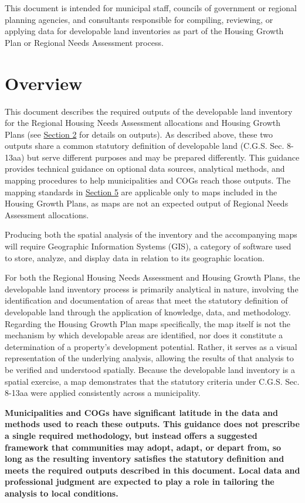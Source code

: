 \documentclass[
  letterpaper,
  DIV=11,
  numbers=noendperiod]{scrreprt}
\begin{document}
This document is intended for municipal staff, councils of government or
regional planning agencies, and consultants responsible for compiling,
reviewing, or applying data for developable land inventories as part of
the Housing Growth Plan or Regional Needs Assessment process.

\section{Overview}\label{overview}

This document describes the required outputs of the developable land
inventory for the Regional Housing Needs Assessment allocations and
Housing Growth Plans (see \href{outputs.qmd}{Section 2} for details on
outputs). As described above, these two outputs share a common statutory
definition of developable land (C.G.S. Sec. 8-13aa) but serve different
purposes and may be prepared differently. This guidance provides
technical guidance on optional data sources, analytical methods, and
mapping procedures to help municipalities and COGs reach those outputs.
The mapping standards in \href{maps.qmd}{Section 5} are applicable only
to maps included in the Housing Growth Plans, as maps are not an
expected output of Regional Needs Assessment allocations.

Producing both the spatial analysis of the inventory and the
accompanying maps will require Geographic Information Systems (GIS), a
category of software used to store, analyze, and display data in
relation to its geographic location.

For both the Regional Housing Needs Assessment and Housing Growth Plans,
the developable land inventory process is primarily analytical in
nature, involving the identification and documentation of areas that
meet the statutory definition of developable land through the
application of knowledge, data, and methodology. Regarding the Housing
Growth Plan maps specifically, the map itself is not the mechanism by
which developable areas are identified, nor does it constitute a
determination of a property's development potential. Rather, it serves
as a visual representation of the underlying analysis, allowing the
results of that analysis to be verified and understood spatially.
Because the developable land inventory is a spatial exercise, a map
demonstrates that the statutory criteria under C.G.S. Sec. 8-13aa were
applied consistently across a municipality.

\textbf{Municipalities and COGs have significant latitude in the data
and methods used to reach these outputs. This guidance does not
prescribe a single required methodology, but instead offers a suggested
framework that communities may adopt, adapt, or depart from, so long as
the resulting inventory satisfies the statutory definition and meets the
required outputs described in this document. Local data and professional
judgment are expected to play a role in tailoring the analysis to local
conditions.}
\end{document}
